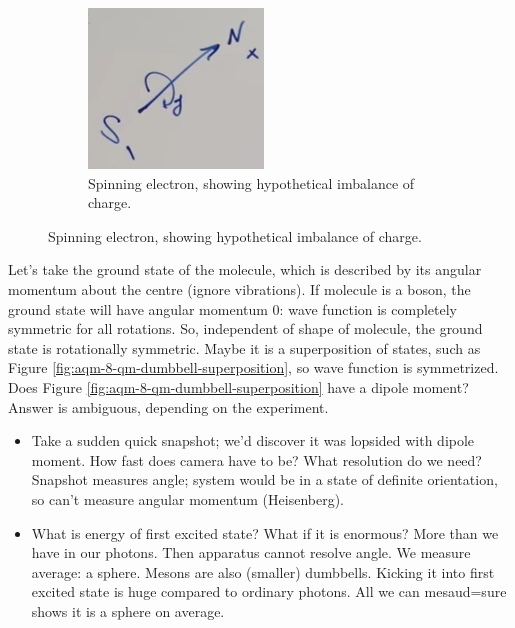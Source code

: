 \documentclass[]{article}
\begin{document}
\begin{figure}[H]
\begin{subfigure}[t]{0.3\textwidth}
	\end{subfigure}
	\begin{subfigure}[t]{0.3\textwidth}
		\caption{Spinning electron, showing hypothetical imbalance of charge.}\label{fig:aqm-8-electron-spin}
		\includegraphics[width=\textwidth]{aqm-8-electron-spin}
	\end{subfigure}
\end{figure}
Let's take the ground state of the molecule, which is described by its angular momentum about the centre (ignore vibrations). If molecule is a boson, the ground state will have angular momentum $0$: wave function is completely symmetric for all rotations. So, independent of shape of molecule, the ground state is rotationally symmetric. Maybe it is a superposition of states, such as Figure \ref{fig:aqm-8-qm-dumbbell-superposition}, so wave function is symmetrized. Does Figure \ref{fig:aqm-8-qm-dumbbell-superposition} have a dipole moment? Answer is ambiguous, depending on the experiment.
\begin{itemize}
	\item Take a sudden quick snapshot; we'd discover it was lopsided with dipole moment. How fast does camera have to be? What resolution do we need? Snapshot measures angle; system would be in a state of definite orientation, so can't measure angular momentum (Heisenberg).
	\item What is energy of first excited state? What if it is enormous? More than we have in our photons. Then apparatus cannot resolve angle. We measure average: a sphere. Mesons are also (smaller) dumbbells. Kicking it into first excited state is huge compared to ordinary photons. All we can mesaud=sure shows it is a sphere on average.
\end{itemize}
\end{document}
